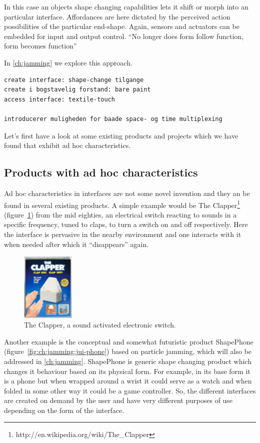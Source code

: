 In this case an objects shape changing capabilities lets it shift or morph into an particular interface.
Affordances are here dictated by the perceived action possibilities of the particular end-shape.
Again, sensors and actuators can be embedded for input and output control.
``No longer does form follow function, form becomes function''

In \autoref{ch:jamming} we explore this approach.

\begin{verbatim}
create interface: shape-change tilgange
create i bogstavelig forstand: bare paint
access interface: textile-touch

introducerer muligheden for baade space- og time multiplexing
\end{verbatim}

Let's first have a look at some existing products and projects which we have found that exhibit ad hoc characteristics. 

\subsection{Products with ad hoc characteristics}
Ad hoc characteristics in interfaces are not some novel invention and they an be found in several existing products.
A simple example would be The Clapper\footnote{http://en.wikipedia.org/wiki/The\_Clapper} (figure~\ref{ch:adhoc:theclapper}) from the mid eighties, an electrical switch reacting to sounds in a specific frequency, tuned to claps, to turn a switch on and off respectively.
Here the interface is pervasive in the nearby environment and one interacts with it when needed after which it ``disappears'' again.

\begin{figure}[hb]
	\centering
  		\includegraphics[width=1in]{figures/theclapper}
	\caption[The Clapper, a sound activated electronic switch.]
   {The Clapper, a sound activated electronic switch.}
   \label{ch:adhoc:theclapper}
\end{figure}

Another example is the conceptual and somewhat futuristic product ShapePhone (figure~\ref{fig:ch:jamming:jui-phone}) based on particle jamming, which will also be addressed in \autoref{ch:jamming}.
ShapePhone is generic shape changing product which changes it behaviour based on its physical form.
For example, in its base form it is a phone but when wrapped around a wrist it could serve as a watch and when folded in some other way it could be a game controller.
So, the different interfaces are created on demand by the user and have very different purposes of use depending on the form of the interface.

